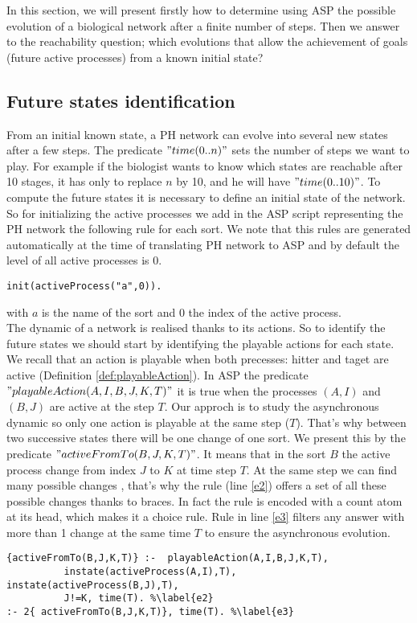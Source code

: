 
In this section, we will present firstly how to determine using ASP the possible evolution of a biological network after a finite number of steps. Then we answer to the reachability question; which evolutions that allow the achievement of goals (future active processes) from a known initial state?

\subsection{Future states identification }
From an initial known state, a PH network can evolve into several new states after a few steps. The predicate $"time (0 .. n)"$ sets the number of steps we want to play. For example if the biologist wants to know which states are reachable after 10 stages, it has only to replace $n$ by 10, and he will have $"time (0 .. 10)"$. To compute the future states it is necessary to define an initial state of the network. So for initializing the active processes we add in the ASP script representing the PH network the following rule for each sort. We note that this rules are generated automatically at the time of translating PH network to ASP and by default the level of all active processes is $0$.\\
\begin{lstlisting}
init(activeProcess("a",0)).
\end{lstlisting}
with $a$ is the name of the sort and $0$ the index of the active process.\\
The dynamic of a network is realised thanks to its actions. So to identify the future states we should start by identifying the playable actions for each state. We recall that an action is playable when both precesses: hitter and taget are active (Definition \ref{def:playableAction}). In ASP the predicate $"playableAction(A,I,B,J,K,T)"$ it is true when the processes $(A,I)$ and $(B,J)$ are active at the step $T$.
Our approch is to study the asynchronous dynamic so only one action is playable at the same step ($T$). That's why between two successive states there will be one change of one sort. We present this by the predicate $"activeFromTo(B,J,K,T)"$. It means that in the sort $B$ the active process change from index $J$ to $K$ at time step $T$.
At the same step we can find many possible changes , that's why the rule (line \ref{e2}) offers a set of all these possible changes thanks to braces.
In fact the rule is encoded with a count atom at its head, which makes it a choice rule. Rule in line \ref{e3} filters any answer with more than 1 change at the same time $T$ to ensure the asynchronous evolution.
\begin{lstlisting}
{activeFromTo(B,J,K,T)} :-  playableAction(A,I,B,J,K,T),
          instate(activeProcess(A,I),T), instate(activeProcess(B,J),T),
          J!=K, time(T). %\label{e2}
:- 2{ activeFromTo(B,J,K,T)}, time(T). %\label{e3}
\end{lstlisting}

